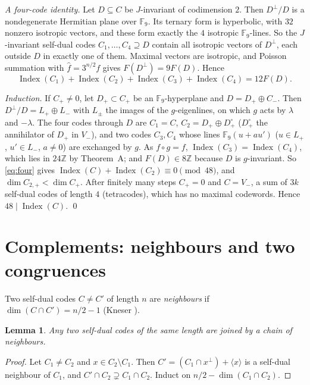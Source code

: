 \documentclass[11pt]{amsart}
\newtheorem{lemma}[theorem]{Lemma}
\theoremstyle{definition}
\newcommand{\Z}{\mathbb{Z}}
\newcommand{\Index}{\operatorname{Index}}
\begin{document}
\emph{A four-code identity.} Let $D\subseteq C$ be $J$-invariant of codimension $2$. Then $D^\perp/D$
is a nondegenerate Hermitian plane over $\mathbb F_9$. Its ternary form is hyperbolic, with $32$
nonzero isotropic vectors, and these form exactly the $4$ isotropic $\mathbb F_9$-lines. So the
$J$-invariant self-dual codes $C_1,\dots,C_4\supseteq D$ contain all isotropic vectors of $D^\perp$,
each outside $D$ in exactly one of them. Maximal vectors are isotropic, and Poisson summation with
$\hat f=3^{n/2}f$ gives $F(D^\perp)=9F(D)$. Hence
\begin{equation}\label{eq:four}
  \Index(C_1)+\Index(C_2)+\Index(C_3)+\Index(C_4)=12F(D).
\end{equation}

\emph{Induction.} If $C_+\ne0$, let $D_+\subset C_+$ be an $\mathbb F_9$-hyperplane and
$D=D_+\oplus C_-$. Then $D^\perp/D=L_+\oplus L_-$ with $L_\pm$ the images of the $g$-eigenlines, on
which $g$ acts by $\lambda$ and $-\lambda$. The four codes through $D$ are $C_1=C$,
$C_2=D_+\oplus D_+^\circ$ ($D_+^\circ$ the annihilator of $D_+$ in $V_-$), and two codes $C_3,C_4$
whose lines $\mathbb F_9(u+au')$ ($u\in L_+$, $u'\in L_-$, $a\ne0$) are exchanged by $g$. As $f\circ
g=f$, $\Index(C_3)=\Index(C_4)$, which lies in $24\Z$ by Theorem~A; and $F(D)\in8\Z$ because $D$ is
$g$-invariant. So \eqref{eq:four} gives $\Index(C)+\Index(C_2)\equiv0\pmod{48}$, and $\dim C_{2,+}<
\dim C_+$. After finitely many steps $C_+=0$ and $C=V_-$, a sum of $3k$ self-dual codes of length $4$
(tetracodes), which has no maximal codewords. Hence $48\mid\Index(C)$. \qed

\section{Complements: neighbours and two congruences}\label{sec:complements}

Two self-dual codes $C\ne C'$ of length $n$ are \emph{neighbours} if $\dim(C\cap C')=n/2-1$
(Kneser \cite{Kneser}).

\begin{lemma}\label{lem:connected}
Any two self-dual codes of the same length are joined by a chain of neighbours.
\end{lemma}

\begin{proof}
Let $C_1\ne C_2$ and $x\in C_2\setminus C_1$. Then $C'=(C_1\cap x^\perp)+\langle x\rangle$ is a
self-dual neighbour of $C_1$, and $C'\cap C_2\supsetneq C_1\cap C_2$. Induct on
$n/2-\dim(C_1\cap C_2)$.
\end{proof}
\end{document}
